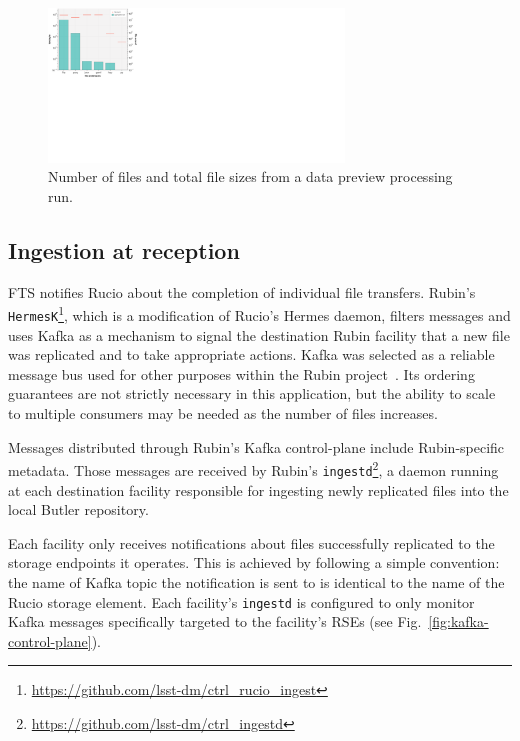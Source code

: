 \documentclass{webofc}
\begin{document}
\begin{figure}[h]
\includegraphics[width=0.7\textwidth, center]{images/file_count_and_file_sizes.pdf}
\caption{Number of files and total file sizes from a data preview processing run.}
\label{fig:filecount}
\end{figure}

\subsection{Ingestion at reception}
\label{ingestion}

FTS notifies Rucio about the completion of individual file transfers. Rubin's \texttt{HermesK}\footnote{\url{https://github.com/lsst-dm/ctrl_rucio_ingest}}, which is a modification of Rucio's Hermes daemon, filters messages and uses Kafka as a mechanism to signal the destination Rubin facility that a new file was replicated and to take appropriate actions. Kafka was selected as a reliable message bus used for other purposes within the Rubin project\ \citep[see e.g.,][]{2024SPIE13101E..1MF,2024SPIE13101E..18R}. Its ordering guarantees are not strictly necessary in this application, but the ability to scale to multiple consumers may be needed as the number of files increases.

Messages distributed through Rubin's Kafka control-plane include Rubin-specific metadata. Those messages are received by Rubin's \texttt{ingestd}\footnote{\url{https://github.com/lsst-dm/ctrl_ingestd}}, a daemon running at each destination facility responsible for ingesting newly replicated files into the local Butler repository.

Each facility only receives notifications about files successfully replicated to the storage endpoints it operates. This is achieved by following a simple convention: the name of Kafka topic the notification is sent to is identical to the name of the Rucio storage element. Each facility's \texttt{ingestd} is configured to only monitor Kafka messages specifically targeted to the facility's RSEs (see Fig.\ \ref{fig:kafka-control-plane}).
\end{document}
